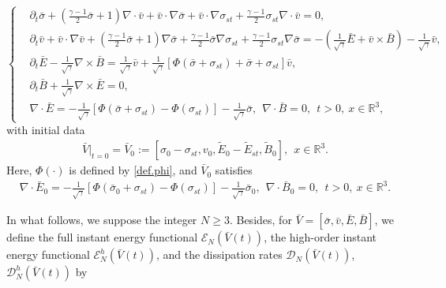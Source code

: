 \documentclass[11pt]{amsart}
\numberwithin{equation}{section}
\begin{document}
\begin{equation}\label{sta.equ}
\left\{
 \begin{aligned}
  &\partial_t \bar{\sigma}+(\frac{\gamma-1}{2}\bar{\sigma}+1)\nabla\cdot \bar{v}+\bar{v}\cdot \nabla \bar{\sigma}
  +\bar{v}\cdot \nabla \sigma_{st}+\frac{\gamma-1}{2}\sigma_{st}\nabla\cdot \bar{v}=0,\\
  &\partial_t \bar{v}+\bar{v} \cdot \nabla
  \bar{v}+(\frac{\gamma-1}{2}\bar{\sigma}+1)\nabla \bar{\sigma}
  +\frac{\gamma-1}{2}\bar{\sigma}\nabla \sigma_{st}+\frac{\gamma-1}{2}\sigma_{st}\nabla\bar{\sigma}=
  -(\frac{1}{\sqrt{\gamma}}\bar{E}+\bar{v}\times \bar{B})
  -\frac{1}{\sqrt{\gamma}}\bar{v},\\
  &\partial_t\bar{E}-\frac{1}{\sqrt{\gamma}}\nabla\times \bar{B}
  =\frac{1}{\sqrt{\gamma}}\bar{v}+
  \frac{1}{\sqrt{\gamma}}[\Phi(\bar{\sigma}+\sigma_{st})+\bar{\sigma}+\sigma_{st}]\bar{v},\\
  &\partial_t \bar{B}+\frac{1}{\sqrt{\gamma}}\nabla \times \bar{E}=0,\\
 &\nabla \cdot
  \bar{E}=-\frac{1}{\sqrt{\gamma}}[\Phi(\bar{\sigma}+\sigma_{st})-\Phi(\sigma_{st})]
  -\frac{1}{\sqrt{\gamma}}\bar{\sigma}, \ \ \nabla
  \cdot \bar{B}=0,  \ \ t>0,\ x\in\mathbb{R}^{3},
\end{aligned}\right.
\end{equation}
with initial data
\begin{eqnarray}\label{sta.equi}
\bar{V}|_{t=0}=\bar{V}_{0}:=[\sigma_{0}-\sigma_{st},v_{0},\tilde{E}_{0}-\tilde{E}_{st},\tilde{B}_{0}],\
\ x\in\mathbb{R}^{3}.
\end{eqnarray}
Here, $\Phi(\cdot)$  is defined by \eqref{def.phi},
 and  $\bar{V}_{0}$ satisfies
\begin{eqnarray}\label{sta.equC}
   \nabla \cdot
  \bar{E}_{0}=-\frac{1}{\sqrt{\gamma}}[\Phi(\bar{\sigma}_{0}+\sigma_{st})-\Phi(\sigma_{st})]
  -\frac{1}{\sqrt{\gamma}}\bar{\sigma}_{0}, \ \ \nabla
  \cdot \bar{B}_{0}=0, \ \ t>0,\ x\in\mathbb{R}^{3}.
\end{eqnarray}

In what follows, we suppose the integer $N \geq 3$. Besides, for
$\bar{V}=[\bar{\sigma},\bar{v},\bar{E},\bar{B}]$, we define the full
instant energy functional $\mathcal {E}_{N}(\bar{V}(t))$, the
high-order instant energy functional $\mathcal
{E}_{N}^{h}(\bar{V}(t))$, and the dissipation rates $\mathcal
{D}_{N}(\bar{V}(t))$, $\mathcal {D}_{N}^{h}(\bar{V}(t))$ by
\end{document}
